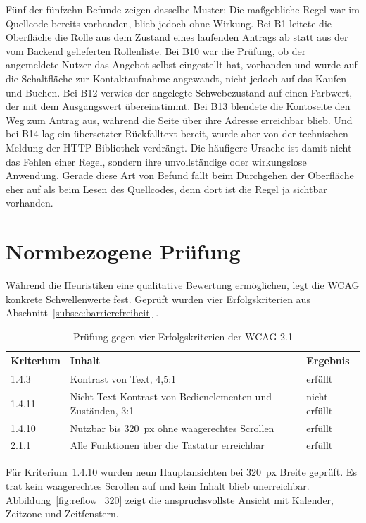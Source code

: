 Fünf der fünfzehn Befunde zeigen dasselbe Muster: Die maßgebliche
Regel war im Quellcode bereits vorhanden, blieb jedoch ohne Wirkung.
Bei B1 leitete die Oberfläche die Rolle aus dem Zustand eines
laufenden Antrags ab statt aus der vom Backend gelieferten
Rollenliste. Bei B10 war die Prüfung, ob der angemeldete Nutzer das
Angebot selbst eingestellt hat, vorhanden und wurde auf die
Schaltfläche zur Kontaktaufnahme angewandt, nicht jedoch auf das
Kaufen und Buchen. Bei B12 verwies der angelegte Schwebezustand auf
einen Farbwert, der mit dem Ausgangswert übereinstimmt. Bei B13
blendete die Kontoseite den Weg zum Antrag aus, während die Seite
über ihre Adresse erreichbar blieb. Und bei B14 lag ein übersetzter
Rückfalltext bereit, wurde aber von der technischen Meldung der
HTTP-Bibliothek verdrängt. Die häufigere Ursache ist damit nicht das
Fehlen einer Regel, sondern ihre unvollständige oder wirkungslose
Anwendung. Gerade diese Art von Befund fällt beim Durchgehen der
Oberfläche eher auf als beim Lesen des Quellcodes, denn dort ist die
Regel ja sichtbar vorhanden.

\section{Normbezogene Prüfung}
\label{sec:normbezogene_pruefung}

Während die Heuristiken eine qualitative Bewertung ermöglichen, legt
die \acs{WCAG} konkrete Schwellenwerte fest. Geprüft wurden vier
Erfolgskriterien aus Abschnitt~\ref{subsec:barrierefreiheit}
\cite{wcag21}.

\begin{table}[H]
\centering
\caption{Prüfung gegen vier Erfolgskriterien der WCAG 2.1}
\label{tab:wcag_pruefung}
\begin{tabular}{|l|p{6.2cm}|p{3.4cm}|}
\hline
\textbf{Kriterium} & \textbf{Inhalt} & \textbf{Ergebnis} \\
\hline
1.4.3 & Kontrast von Text, 4,5:1 & erfüllt \\
\hline
1.4.11 & Nicht-Text-Kontrast von Bedienelementen und Zuständen, 3:1 & nicht erfüllt \\
\hline
1.4.10 & Nutzbar bis 320~px ohne waagerechtes Scrollen & erfüllt \\
\hline
2.1.1 & Alle Funktionen über die Tastatur erreichbar & erfüllt \\
\hline
\end{tabular}
\end{table}

Für Kriterium~1.4.10 wurden neun Hauptansichten bei 320~px Breite
geprüft. Es trat kein waagerechtes Scrollen auf und kein Inhalt blieb
unerreichbar. Abbildung~\ref{fig:reflow_320} zeigt die anspruchsvollste
Ansicht mit Kalender, Zeitzone und Zeitfenstern.

